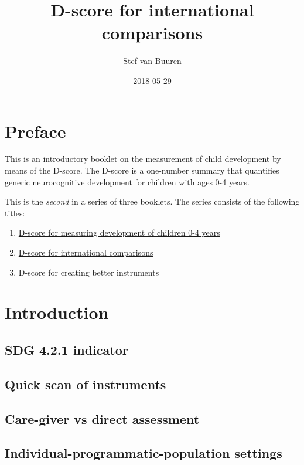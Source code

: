 \documentclass[]{book}
\title{D-score for international comparisons}
\author{Stef van Buuren}
\date{2018-05-29}
\providecommand{\tightlist}{%
  \setlength{\itemsep}{0pt}\setlength{\parskip}{0pt}}
\theoremstyle{definition}
\theoremstyle{definition}
\theoremstyle{definition}
\theoremstyle{remark}
\begin{document}
\maketitle

{
\setcounter{tocdepth}{1}
\tableofcontents
}
\chapter*{Preface}\label{preface}

This is an introductory booklet on the measurement of child development
by means of the D-score. The D-score is a one-number summary that
quantifies generic neurocognitive development for children with ages 0-4
years.

This is the \emph{second} in a series of three booklets. The series
consists of the following titles:

\begin{enumerate}
\def\labelenumi{\arabic{enumi}.}
\tightlist
\item
  \href{https://stefvanbuuren.github.io/dbook1/}{D-score for measuring
  development of children 0-4 years}
\item
  \href{https://stefvanbuuren.github.io/dbook2/}{D-score for
  international comparisons}
\item
  D-score for creating better instruments
\end{enumerate}

\chapter{Introduction}\label{ch:introduction2}

\section{SDG 4.2.1 indicator}\label{sdg-4.2.1-indicator}

\section{Quick scan of instruments}\label{quick-scan-of-instruments}

\section{Care-giver vs direct
assessment}\label{care-giver-vs-direct-assessment}

\section{Individual-programmatic-population
settings}\label{individual-programmatic-population-settings}
\end{document}
